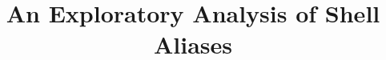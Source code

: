 \documentclass[sigconf,review, anonymous]{acmart}
\begin{document}
\title{An Exploratory Analysis of Shell Aliases}

%

\begin{abstract}
	
\end{abstract}

\maketitle



















\end{document}

